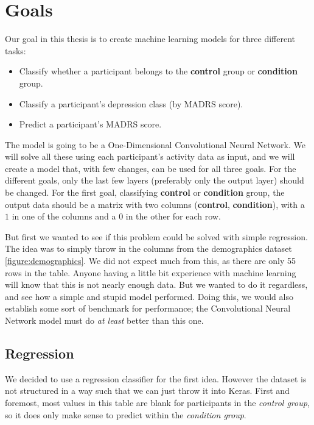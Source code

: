 \section{Goals}

Our goal in this thesis is to create machine learning models for three different tasks:

\begin{itemize}
  \item Classify whether a participant belongs to the \textbf{control} group or \textbf{condition} group.
  \item Classify a participant's depression class (by MADRS score).
  \item Predict a participant's MADRS score.
\end{itemize}

The model is going to be a One-Dimensional Convolutional Neural Network. 
We will solve all these using each participant's activity data as input, and we will create a model that, with few changes, can be used for all three goals.
For the different goals, only the last few layers (preferably only the output layer) should be changed. For the first goal, 
classifying \textbf{control} or \textbf{condition} group, the output data should be a matrix with two columns (\textbf{control}, \textbf{condition}), 
with a $1$ in one of the columns and a $0$ in the other for each row.

But first we wanted to see if this problem could be solved with simple regression. The idea was to simply throw in the columns from the 
demographics dataset \ref{figure:demographics}. We did not expect much from this, as there are only 55 rows in the table. Anyone having a little bit experience 
with machine learning will know that this is not nearly enough data. But we wanted to do it regardless, and see how a simple and stupid model performed.
Doing this, we would also establish some sort of benchmark for performance; the Convolutional Neural Network model must do \textit{at least} better than this one.

\subsection{Regression}

We decided to use a regression classifier for the first idea. However the dataset is not structured in a way such that we can just throw it into Keras.
First and foremost, most values in this table are blank for participants in the \textit{control group}, so it does only make sense to predict within 
the \textit{condition group}. 

